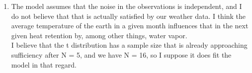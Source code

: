 \documentclass[a4paper,12pt]{article}
\begin{document}
\begin{enumerate}
\item The model assumes that the noise in the observations is independent, and I do not believe that that is actually satisfied by our weather data. I think the average temperature of the earth in a given month influences that in the next given heat retention by, among other things, water vapor. \\
I believe that the t distribution has a sample size that is already approaching sufficiency after N = 5, and we have N = 16, so I suppose it does fit the model in that regard. 
\end{enumerate}
\end{document}
